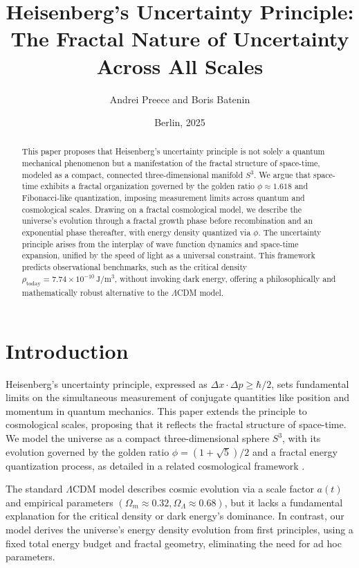 \documentclass[12pt,a4paper]{article}
\title{Heisenberg's Uncertainty Principle: The Fractal Nature of Uncertainty Across All Scales}
\author{Andrei Preece and Boris Batenin}
\date{Berlin, 2025}
\begin{document}
\maketitle

\begin{abstract}
This paper proposes that Heisenberg's uncertainty principle is not solely a quantum mechanical phenomenon but a manifestation of the fractal structure of space-time, modeled as a compact, connected three-dimensional manifold \(S^3\). We argue that space-time exhibits a fractal organization governed by the golden ratio \(\phi \approx 1.618\) and Fibonacci-like quantization, imposing measurement limits across quantum and cosmological scales. Drawing on a fractal cosmological model, we describe the universe's evolution through a fractal growth phase before recombination and an exponential phase thereafter, with energy density quantized via \(\phi\). The uncertainty principle arises from the interplay of wave function dynamics and space-time expansion, unified by the speed of light as a universal constraint. This framework predicts observational benchmarks, such as the critical density \(\rho_{\text{today}} = 7.74 \times 10^{-10}\,\mathrm{J/m^3}\), without invoking dark energy, offering a philosophically and mathematically robust alternative to the \(\Lambda\)CDM model.
\end{abstract}

\section{Introduction}

Heisenberg's uncertainty principle, expressed as \(\Delta x \cdot \Delta p \geq \hbar/2\), sets fundamental limits on the simultaneous measurement of conjugate quantities like position and momentum in quantum mechanics. This paper extends the principle to cosmological scales, proposing that it reflects the fractal structure of space-time. We model the universe as a compact three-dimensional sphere \(S^3\), with its evolution governed by the golden ratio \(\phi = (1 + \sqrt{5})/2\) and a fractal energy quantization process, as detailed in a related cosmological framework \cite{preece_batenin_2025}.

The standard \(\Lambda\)CDM model describes cosmic evolution via a scale factor \(a(t)\) and empirical parameters \((\Omega_m \approx 0.32, \Omega_\Lambda \approx 0.68)\), but it lacks a fundamental explanation for the critical density or dark energy's dominance. In contrast, our model derives the universe's energy density evolution from first principles, using a fixed total energy budget and fractal geometry, eliminating the need for ad hoc parameters.
\end{document}
